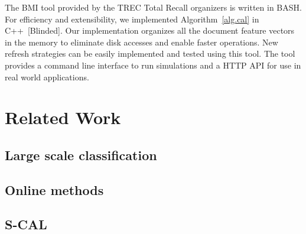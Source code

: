 The BMI tool provided by the TREC Total Recall organizers is written in BASH.
For efficiency and extensibility, we implemented Algorithm~\ref{alg.cal} in
C++~[Blinded]. Our implementation organizes all the document feature vectors in
the memory to eliminate disk accesses and enable faster operations. New refresh
strategies can be easily implemented and tested using this tool. The tool
provides a command line interface to run simulations and a HTTP API for use in
real world applications.

\section{Related Work}
\subsection{Large scale classification}
\subsection{Online methods}
\subsection{S-CAL}
